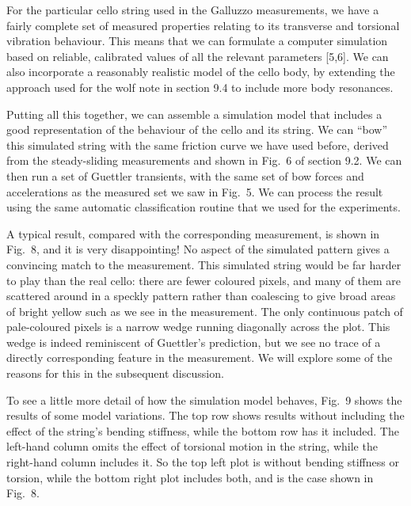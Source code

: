   For the particular cello string used in the Galluzzo measurements, we have a 
  fairly complete set of measured properties relating to its transverse and 
  torsional vibration behaviour. This means that we can formulate a computer 
  simulation based on reliable, calibrated values of all the relevant 
  parameters [5,6]. We can also incorporate a reasonably realistic model of the 
  cello body, by extending the approach used for the wolf note in section 9.4 
  to include more body resonances. 

  Putting all this together, we can assemble a simulation model that includes a 
  good representation of the behaviour of the cello and its string. We can 
  “bow” this simulated string with the same friction curve we have used before, 
  derived from the steady-sliding measurements and shown in Fig.\ 6 of section 
  9.2. We can then run a set of Guettler transients, with the same set of bow 
  forces and accelerations as the measured set we saw in Fig.\ 5. We can 
  process the result using the same automatic classification routine that we 
  used for the experiments. 

  A typical result, compared with the corresponding measurement, is shown in 
  Fig.\ 8, and it is very disappointing! No aspect of the simulated pattern 
  gives a convincing match to the measurement. This simulated string would be 
  far harder to play than the real cello: there are fewer coloured pixels, and 
  many of them are scattered around in a speckly pattern rather than coalescing 
  to give broad areas of bright yellow such as we see in the measurement. The 
  only continuous patch of pale-coloured pixels is a narrow wedge running 
  diagonally across the plot. This wedge is indeed reminiscent of Guettler's 
  prediction, but we see no trace of a directly corresponding feature in the 
  measurement. We will explore some of the reasons for this in the subsequent 
  discussion. 

  To see a little more detail of how the simulation model behaves, Fig.\ 9 
  shows the results of some model variations. The top row shows results without 
  including the effect of the string's bending stiffness, while the bottom row 
  has it included. The left-hand column omits the effect of torsional motion in 
  the string, while the right-hand column includes it. So the top left plot is 
  without bending stiffness or torsion, while the bottom right plot includes 
  both, and is the case shown in Fig.\ 8. 

